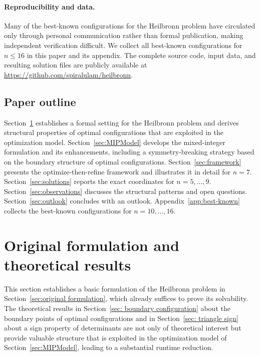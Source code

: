 \documentclass[11pt,a4paper]{article}
\theoremstyle{plain}
\theoremstyle{definition}
\theoremstyle{remark}
\begin{document}
\paragraph{Reproducibility and data.}
Many of the best-known configurations for the Heilbronn problem have circulated only through personal communication rather than formal publication, making independent verification difficult.  We collect all best-known configurations for $n \le 16$ in this paper and its appendix.
The complete source code, input data, and resulting solution files are publicly
available at \url{https://github.com/spiralulam/heilbronn}.

\subsection{Paper outline}

Section~\ref{sec:formulation} establishes a formal setting for the Heilbronn problem and derives structural properties of optimal configurations that are exploited in the optimization model.
Section~\ref{sec:MIPModel} develops the mixed-integer formulation and its enhancements, including a symmetry-breaking strategy based on the boundary structure of optimal configurations.
Section~\ref{sec:framework} presents the optimize-then-refine framework and illustrates it in detail for $n=7$.
Section~\ref{sec:solutions} reports the exact coordinates for $n = 5, \ldots, 9$.
Section~\ref{sec:observations} discusses the structural patterns and open questions.
Section~\ref{sec:outlook} concludes with an outlook.
Appendix~\ref{app:best-known} collects the best-known configurations for $n = 10, \ldots, 16$.

\section{Original formulation and theoretical results}\label{sec:formulation}

This section establishes a basic formulation of the Heilbronn problem in Section~\ref{sec:original formulation}, which already suffices to prove its solvability.
The theoretical results in Section~\ref{sec: boundary configuration} about the boundary points of optimal configurations and in Section~\ref{sec: triangle sign}
about a sign property of determinants are not only of theoretical interest but provide valuable structure that is exploited in the optimization model of Section~\ref{sec:MIPModel}, leading to a substantial runtime reduction.
\end{document}
